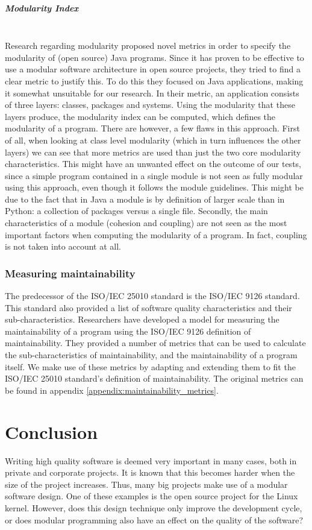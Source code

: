 \documentclass[twoside]{uva-inf-bachelor-thesis}
\newcommand{\myparagraph}[1]{\paragraph{#1}\mbox{}\\}
\begin{document}
\myparagraph{Modularity Index}
Research regarding modularity proposed novel metrics in order to specify the modularity of (open source) Java programs\cite{emanuel2013modularity}. Since it has proven to be effective to use a modular software architecture in open source projects\cite{lee2000linux}, they tried to find a clear metric to justify this. To do this they focused on Java applications, making it somewhat unsuitable for our research. In their metric, an application consists of three layers: classes, packages and systems. Using the modularity that these layers produce, the modularity index can be computed, which defines the modularity of a program. There are however, a few flaws in this approach. First of all, when looking at class level modularity (which in turn influences the other layers) we can see that more metrics are used than just the two core modularity characteristics. This might have an unwanted effect on the outcome of our tests, since a simple program contained in a single module is not seen as fully modular using this approach, even though it follows the module guidelines. This might be due to the fact that in Java a module is by definition of larger scale than in Python: a collection of packages versus a single file. Secondly, the main characteristics of a module (cohesion and coupling) are not seen as the most important factors when computing the modularity of a program. In fact, coupling is not taken into account at all.

\subsection*{Measuring maintainability}
The predecessor of the ISO/IEC 25010 standard is the ISO/IEC 9126 standard\cite{ISO9126}. This standard also provided a list of software quality characteristics and their sub-characteristics. Researchers have developed a model for measuring the maintainability of a program using the ISO/IEC 9126 definition of maintainability\cite{heitlager2016practical}. They provided a number of metrics that can be used to calculate the sub-characteristics of maintainability, and the maintainability of a program itself. We make use of these metrics by adapting and extending them to fit the ISO/IEC 25010 standard's definition of maintainability. The original metrics can be found in appendix \ref{appendix:maintainability_metrics}.

\chapter{Conclusion}
\label{chapter:conclusion}
Writing high quality software is deemed very important in many cases, both in private and corporate projects. It is known that this becomes harder when the size of the project increases\cite{bhatia2014survey,banker1993software}. Thus, many big projects make use of a modular software design. One of these examples is the open source project for the Linux kernel\cite{lee2000linux}. However, does this design technique only improve the development cycle, or does modular programming also have an effect on the quality of the software?\\
\end{document}
